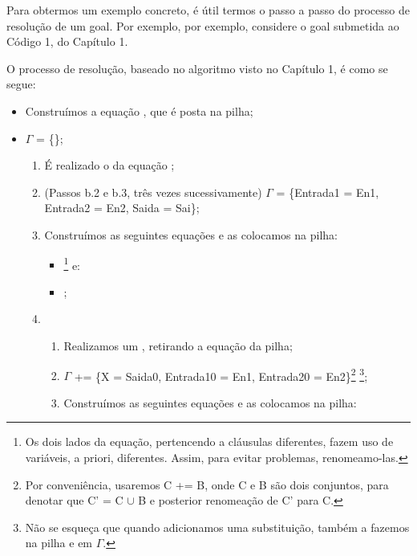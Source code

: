 \documentclass{article}
\begin{document}
Para obtermos um exemplo concreto, é útil termos o passo a passo do
processo de resolução de um goal. Por exemplo, por exemplo, considere
o goal  submetida ao Código 1, do
Capítulo 1.

O processo de resolução, baseado no algoritmo visto no Capítulo 1, é
como se segue:

\begin{itemize}
\item Construímos a equação , que é posta na pilha;
\item $\Gamma$ = \{\};
  \begin{enumerate}
  \item É realizado o  da equação
    ;
  \item (Passos b.2 e b.3, três vezes sucessivamente) $\Gamma$ =
    \{Entrada1 = En1, Entrada2 = En2, Saida = Sai\};
  \item Construímos as seguintes equações e as
    colocamos na pilha:
    \begin{itemize}
        \item {}\footnote{Os
          dois lados da equação, pertencendo a cláusulas diferentes,
          fazem uso de variáveis, a priori, diferentes. Assim, para
          evitar problemas, renomeamo-las.} e:
        \item {};
    \end{itemize}
  \item
    \begin{enumerate}
    \item Realizamos um , retirando a equação
       da pilha;
    \item $\Gamma$ += \{X = Saida0, Entrada10 = En1, Entrada20 =
      En2\}\footnote{Por conveniência, usaremos C += B, onde C e
        B são dois conjuntos, para denotar que C' = C $\cup$ B e
        posterior renomeação de C' para C.} \footnote{Não se
        esqueça que quando adicionamos uma substituição, também
        a fazemos na pilha e em $\Gamma$.};
    \item Construímos as seguintes equações e as colocamos na pilha:
      \begin{itemize}

\end{itemize}
\end{enumerate}
\end{enumerate}
\end{itemize}
\end{document}
